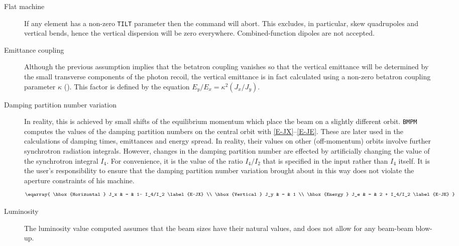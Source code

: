 \begin{description}
 
\item[Flat machine] If any element has a non-zero {\tt TILT} parameter
then the command will abort. This
excludes, in particular, skew quadrupoles and vertical bends,
hence the vertical dispersion will be zero everywhere.
Combined-function dipoles are not accepted.
 
\item[Emittance coupling] Although the previous assumption implies
that the betatron coupling vanishes so that the vertical emittance
will be determined by the small transverse components of the photon
recoil, the vertical emittance is in fact calculated using a non-zero
betatron coupling parameter \(\kappa\) ().
This factor is defined by the equation \(E_y/E_x = \kappa^2 (J_x/J_y)\).
 
\item[Damping partition number variation] In reality, this is achieved
by small shifts of the equilibrium momentum which place the beam on a
slightly different orbit. {\tt BMPM} computes the values of the damping
partition numbers on the central orbit with \eqref{E-JX}--\eqref{E-JE}.
These are later used in the calculations of damping times, emittances
and energy spread. In reality, their values on other (off-momentum)
orbits involve further synchrotron radiation integrals. However,
changes in the damping partition number are effected by
artificially changing the value of the synchrotron integral \(I_4\). For
convenience, it is the value of the ratio \(I_4/I_2\) that is specified
in the input rather than \(I_4\) itself. It is the user's responsibility
to ensure that the damping partition number variation brought about in
this way does not violate the aperture constraints of his machine.
\[
\eqarray{
    \hbox{Horizontal } J_x  & = & 1- I_4/I_2   \label{E-JX} \\
    \hbox{Vertical }  J_y  & = & 1 \\
    \hbox{Energy }  J_e  & = & 2 + I_4/I_2   \label{E-JE}
}
\]
 
\item[Luminosity] The luminosity value computed assumes that the beam
sizes have their natural values,
and does not allow for any beam-beam blow-up.
 
\end{description}
 
